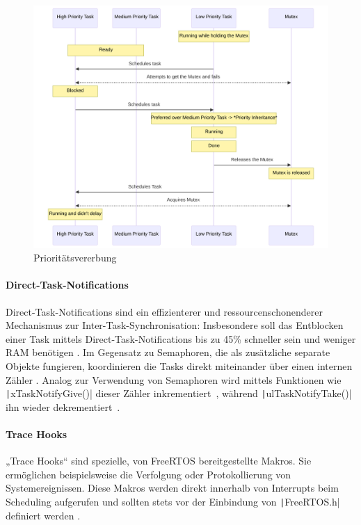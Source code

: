 \begin{figure}[H]
    \centering
    \includegraphics[width=1\textwidth]{assets/prio_inheritance}
    \caption{Prioritätsvererbung}
\end{figure}

\paragraph{Direct-Task-Notifications} \label{sec:direct_task_notification}

Direct-Task-Notifications sind ein effizienterer und ressourcenschonenderer
Mechanismus zur Inter-Task-Synchronisation: Insbesondere soll das Entblocken
einer Task mittels Direct-Task-Notifications bis zu 45\% schneller sein und
weniger RAM benötigen \cite{freertos_task_notifications_usage}. Im Gegensatz zu
Semaphoren, die als zusätzliche separate Objekte fungieren, koordinieren die
Tasks direkt miteinander über einen internen Zähler \cite{freertos_tasks_c_308}.
Analog zur Verwendung von Semaphoren wird mittels Funktionen wie
\texttt|xTaskNotifyGive()| dieser Zähler
inkrementiert~\cite{freertos_tasks_c_4990}, während
\texttt|ulTaskNotifyTake()| ihn wieder
dekrementiert~\cite{freertos_tasks_c_4614}.

\paragraph{Trace Hooks} \label{sec:trace_hooks}

„Trace Hooks“ sind spezielle, von FreeRTOS bereitgestellte Makros. Sie
ermöglichen beispielsweise die Verfolgung oder Protokollierung von
Systemereignissen. Diese Makros werden direkt innerhalb von Interrupts beim
Scheduling aufgerufen und sollten stets vor der Einbindung von
\texttt|FreeRTOS.h| definiert werden \cite{freertos_rtos_trace_hooks}.

